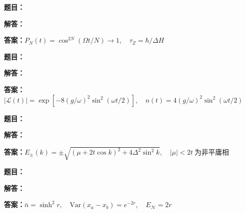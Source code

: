 \documentclass[lang=cn,color=blue,11pt]{elegantbook}
\begin{document}
\par\smallskip\noindent\hrulefill\par\medskip
{}\par
\noindent\textbf{题目：}
\par\noindent\textbf{解答：}
\par\noindent\textbf{答案：}\(\displaystyle P_N(t)=\cos^{2N}(\Omega t/N)\to1,\quad\tau_Z=\hbar/\Delta H\)\par
\par\smallskip\noindent\hrulefill\par\medskip
{}\par
\noindent\textbf{题目：}
\par\noindent\textbf{解答：}
\par\noindent\textbf{答案：}\(\displaystyle |\mathcal L(t)|=\exp[-8(g/\omega)^2\sin^2(\omega t/2)],\quad n(t)=4(g/\omega)^2\sin^2(\omega t/2)\)\par
\par\smallskip\noindent\hrulefill\par\medskip
{}\par
\noindent\textbf{题目：}
\par\noindent\textbf{解答：}
\par\noindent\textbf{答案：}\(\displaystyle E_\pm(k)=\pm\sqrt{(\mu+2t\cos k)^2+4\Delta^2\sin^2k},\quad |\mu|<2t\ \text{为非平庸相}\)\par
\par\smallskip\noindent\hrulefill\par\medskip
{}\par
\noindent\textbf{题目：}
\par\noindent\textbf{解答：}
\par\noindent\textbf{答案：}\(\displaystyle \bar n=\sinh^2 r,\quad \mathrm{Var}(x_a-x_b)=e^{-2r},\quad E_\mathcal N=2r\)\par
\end{document}
